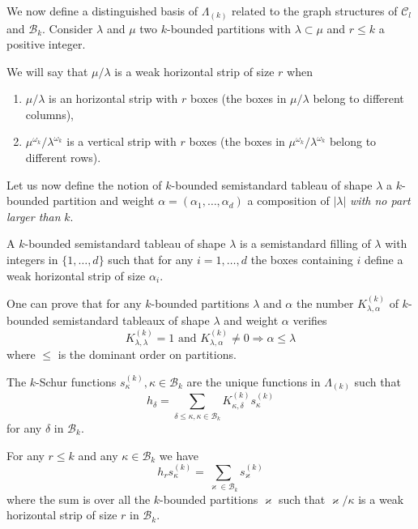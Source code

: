 \documentclass[ALCO,ThmDefs,Unicode,epreuves]{cedram}
\begin{document}
We now define a distinguished basis of $\Lambda_{(k)}$ related to the graph
structures of $\mathcal{C}_{l}$ and $\mathcal{B}_{k}$. Consider $\lambda$ and
$\mu$ two $k$-bounded partitions with $\lambda\subset\mu$ and $r\leq k$ a
positive integer.

\begin{defi}
\label{Def_Hori_Strip}We will say that $\mu/\lambda$ is a weak horizontal
strip of size $r$ when

\begin{enumerate}
\item $\mu/\lambda$ is an horizontal strip with $r$ boxes (\ie the boxes in
$\mu/\lambda$ belong to different columns),

\item $\mu^{\omega_{k}}/\lambda^{\omega_{k}}$ is a vertical strip with $r$
boxes (\ie the boxes in $\mu^{\omega_{k}}/\lambda^{\omega_{k}}$ belong to
different rows).
\end{enumerate}
\end{defi}

Let us now define the notion of $k$-bounded semistandard tableau of shape
$\lambda$ a $k$-bounded partition and weight $\alpha=(\alpha_{1},\ldots
,\alpha_{d})$ a composition of $\left\vert \lambda\right\vert $ \emph{with no
part larger than }$k$. 

\begin{defi}
A $k$-bounded semistandard tableau of shape $\lambda$ is a semistandard
filling of $\lambda$ with integers in $\{1,\ldots,d\}$ such that for any
$i=1,\ldots,d$ the boxes containing $i$ define a weak horizontal strip of size
$\alpha_{i}$.
\end{defi}

One can prove that for any $k$-bounded partitions $\lambda$ and $\alpha$ the
number $K_{\lambda,\alpha}^{(k)}$ of $k$-bounded semistandard tableaux of
shape $\lambda$ and weight $\alpha$ verifies%
\[
K_{\lambda,\lambda}^{(k)}=1\text{ and }K_{\lambda,\alpha}^{(k)}\neq
0\Longrightarrow\alpha\leq\lambda
\]
where $\leq$ is the dominant order on partitions.

\begin{defi}
The $k$-Schur functions $s_{\kappa}^{(k)},\kappa\in\mathcal{B}_{k}$ are the
unique functions in $\Lambda_{(k)}$ such that
\[
h_{\delta}=\sum_{\delta\leq\kappa,\kappa\in\mathcal{B}_{k}}K_{\kappa,\delta
}^{(k)}s_{\kappa}^{(k)}%
\]
for any $\delta$ in $\mathcal{B}_{k}$.
\end{defi}

\begin{prop}
For any $r\leq k$ and any $\kappa
\in\mathcal{B}_{k}$ we have
\begin{equation}
h_{r}s_{\kappa}^{(k)}=\sum_{\varkappa\in\mathcal{B}_{k}}s_{\varkappa}^{(k)}
\label{PieriKSchur}%
\end{equation}
where the sum is over all the $k$-bounded partitions $\varkappa$ such that
$\varkappa/\kappa$ is a weak horizontal strip of size $r$ in $\mathcal{B}_{k}$.
\end{prop}
\end{document}
